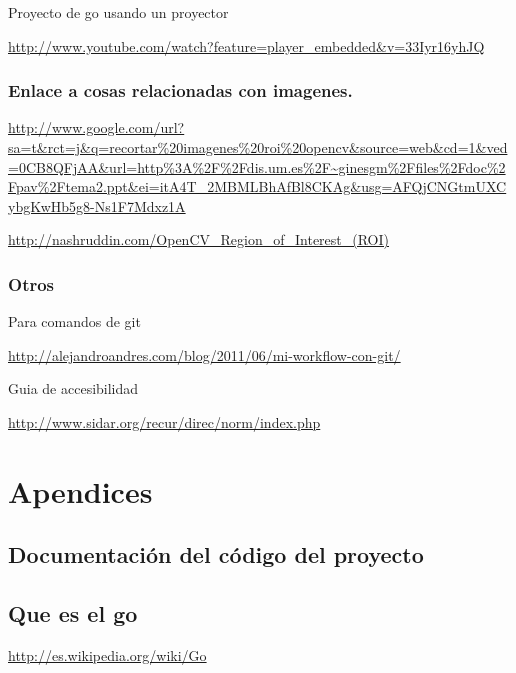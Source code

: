\documentclass[12pt,a4paper]{report}
\begin{document}
Proyecto de go usando un proyector

\url{http://www.youtube.com/watch?feature=player_embedded&v=33Iyr16yhJQ}


\subsection{ Enlace a cosas relacionadas con imagenes.} 

\url{http://www.google.com/url?sa=t&rct=j&q=recortar%20imagenes%20roi%20opencv&source=web&cd=1&ved=0CB8QFjAA&url=http%3A%2F%2Fdis.um.es%2F~ginesgm%2Ffiles%2Fdoc%2Fpav%2Ftema2.ppt&ei=itA4T_2MBMLBhAfBl8CKAg&usg=AFQjCNGtmUXCybgKwHb5g8-Ns1F7Mdxz1A}

\url{http://nashruddin.com/OpenCV_Region_of_Interest_(ROI)}

\subsection{Otros}

Para comandos de git

\url{http://alejandroandres.com/blog/2011/06/mi-workflow-con-git/}

Guia de accesibilidad 

\url{http://www.sidar.org/recur/direc/norm/index.php}


\chapter{Apendices} 



\section{Documentación del código del proyecto} 

\section{Que es el go}
\url{http://es.wikipedia.org/wiki/Go}
\end{document}
